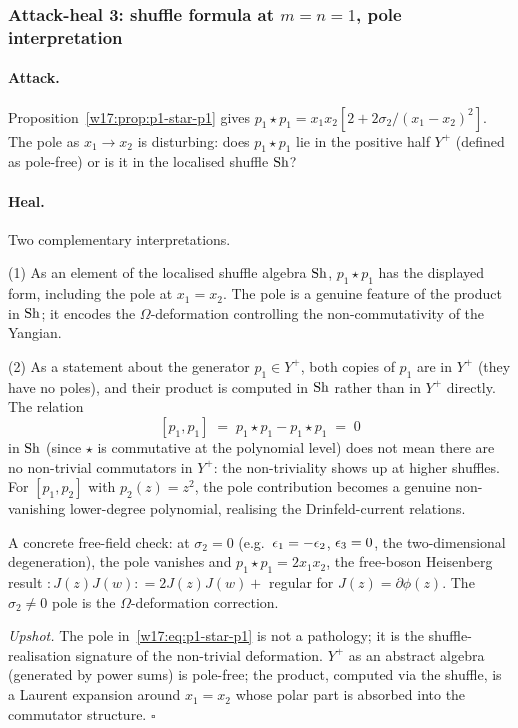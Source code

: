 \subsubsection{Attack-heal 3: shuffle formula at $m = n = 1$, pole interpretation}
\label{w17:subsubsec:ah3-shuffle-m-n-1}

\paragraph{Attack.}
Proposition~\ref{w17:prop:p1-star-p1} gives
$p_1 \star p_1 = x_1 x_2 [2 + 2\sigma_2/(x_1 - x_2)^2]$. The pole as
$x_1 \to x_2$ is disturbing: does $p_1 \star p_1$ lie in the positive half
$Y^+$ (defined as pole-free) or is it in the localised shuffle $\mathrm{Sh}$?

\paragraph{Heal.}
Two complementary interpretations.

(1) As an element of the localised shuffle algebra $\mathrm{Sh}$, $p_1 \star p_1$
has the displayed form, including the pole at $x_1 = x_2$. The pole is
a genuine feature of the product in $\mathrm{Sh}$; it encodes the $\Omega$-deformation
controlling the non-commutativity of the Yangian.

(2) As a statement about the generator $p_1 \in Y^+$, both copies of $p_1$
are in $Y^+$ (they have no poles), and their product is computed in $\mathrm{Sh}$
rather than in $Y^+$ directly. The relation
\[
 [p_1, p_1] \;=\; p_1 \star p_1 - p_1 \star p_1 \;=\; 0
\]
in $\mathrm{Sh}$ (since $\star$ is commutative at the polynomial level) does not mean
there are no non-trivial commutators in $Y^+$: the non-triviality shows up at
higher shuffles. For $[p_1, p_2]$ with $p_2(z) = z^2$, the pole contribution
becomes a genuine non-vanishing lower-degree polynomial, realising the
Drinfeld-current relations.

A concrete free-field check: at $\sigma_2 = 0$ (e.g.\ $\epsilon_1 = -\epsilon_2$,
$\epsilon_3 = 0$, the two-dimensional degeneration), the pole vanishes and
$p_1 \star p_1 = 2 x_1 x_2$, the free-boson Heisenberg result
$:J(z) J(w): = 2 J(z) J(w) + $ regular for $J(z) = \partial\phi(z)$. The
$\sigma_2 \neq 0$ pole is the $\Omega$-deformation correction.

\emph{Upshot.} The pole in~\eqref{w17:eq:p1-star-p1} is not a pathology; it is
the shuffle-realisation signature of the non-trivial deformation. $Y^+$ as an
abstract algebra (generated by power sums) is pole-free; the product, computed
via the shuffle, is a Laurent expansion around $x_1 = x_2$ whose polar part is
absorbed into the commutator structure.
\hfill$\square$


